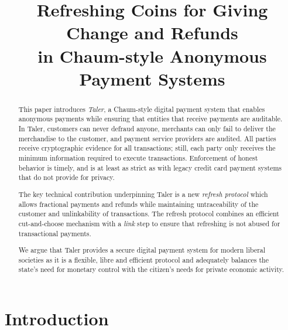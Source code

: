 \documentclass{llncs}
\title{Refreshing Coins for Giving Change and Refunds \\ in Chaum-style Anonymous Payment Systems}
\begin{document}
\mainmatter



\maketitle



\begin{abstract}
This paper introduces {\em Taler}, a Chaum-style digital payment system that
enables anonymous payments while ensuring that entities that receive
payments are auditable.  In Taler, customers can
never defraud anyone, merchants can only fail to deliver the
merchandise to the customer, and payment service providers are
audited.
All parties receive cryptographic evidence for all
transactions; still, each party only receives the minimum information
required to execute transactions.  Enforcement of honest behavior is
timely, and is at least as strict as with legacy credit card payment
systems that do not provide for privacy.

The key technical contribution underpinning Taler is a new {\em
  refresh protocol} which allows fractional payments and refunds while
maintaining untraceability of the customer and unlinkability of
transactions.  The refresh protocol combines an
efficient cut-and-choose mechanism with a {\em link} step to ensure
that refreshing is not abused for transactional payments.

We argue that Taler provides a secure digital payment system for modern
liberal societies as it is a flexible, libre and efficient protocol
and adequately balances the state's need for monetary control with the
citizen's needs for private economic activity.
\end{abstract}

\section{Introduction}
\end{document}
